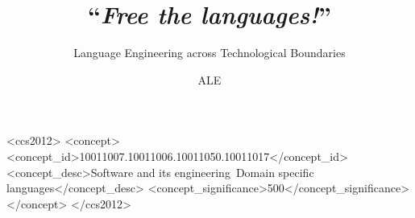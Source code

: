 \documentclass[sigplan]{acmart}
\begin{document}
\title{``\emph{Free the languages!}''}
\subtitle{Language Engineering across Technological Boundaries}

\author{ALE}




%
%
 \begin{CCSXML}
	<ccs2012>
	<concept>
	<concept_id>10011007.10011006.10011050.10011017</concept_id>
	<concept_desc>Software and its engineering~Domain specific languages</concept_desc>
	<concept_significance>500</concept_significance>
	</concept>
	</ccs2012>
\end{CCSXML}




\maketitle
\end{document}

